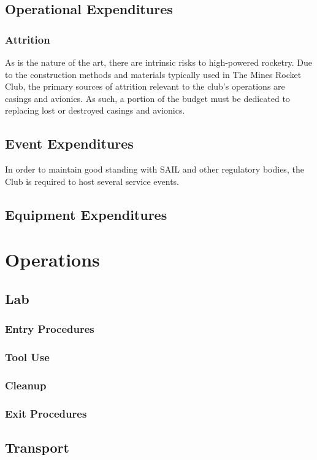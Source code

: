 \documentclass[12pt]{article}
\begin{document}
\subsection{Operational Expenditures}
\subsubsection{Attrition}
As is the nature of the art, there are intrinsic risks to high-powered rocketry.
Due to the construction methods and materials typically used in The Mines Rocket Club,
the primary sources of attrition relevant to the club's operations are casings and avionics.
As such, a portion of the budget must be dedicated to replacing lost or destroyed casings and avionics.
\subsection{Event Expenditures}
In order to maintain good standing with SAIL and other regulatory bodies,
the Club is required to host several service events.

\subsection{Equipment Expenditures}
\section{Operations}
\subsection{Lab}
\subsubsection{Entry Procedures}

\subsubsection{Tool Use}
\subsubsection{Cleanup}
\subsubsection{Exit Procedures}
\subsection{Transport}
\end{document}
